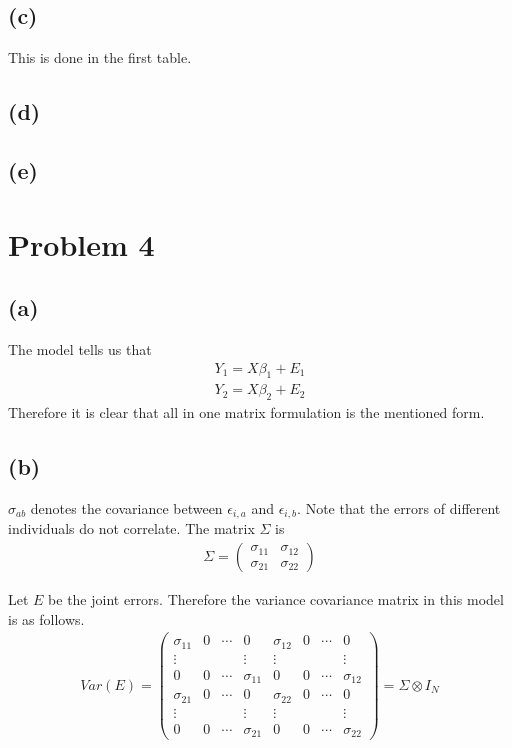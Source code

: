 \documentclass{article}
\begin{document}
\subsection{(c)}
This is done in the first table.

\subsection{(d)}
\subsection{(e)}

\section{Problem 4}
\subsection{(a)}
The model tells us that
\begin{align*}
	Y_1 = X\beta_1 + E_1\\
	Y_2 = X\beta_2 + E_2
\end{align*}
Therefore it is clear that all in one matrix formulation is the mentioned form.

\subsection{(b)}
$\sigma_{ab}$ denotes the covariance between $\epsilon_{i,a}$ and $\epsilon_{i, b}$. Note that the errors of different individuals do not correlate. The matrix $\Sigma$ is
\begin{align*}
\Sigma = \begin{pmatrix}
\sigma_{11} & \sigma_{12}\\
\sigma_{21} & \sigma_{22}
\end{pmatrix}
\end{align*}

 Let $E$ be the joint errors. Therefore the variance covariance matrix in this model is as follows.
\begin{align*}
	Var\left(E \right) = \begin{pmatrix}\sigma_{11}& 0& \cdots& 0&\sigma_{12}&0 &\cdots & 0\\
	\vdots&&&\vdots&\vdots&&&\vdots\\
	0&0&\cdots&\sigma_{11}&0&0&\cdots&\sigma_{12}\\
	\sigma_{21}& 0& \cdots& 0&\sigma_{22}&0 &\cdots & 0\\
	\vdots&&&\vdots&\vdots&&&\vdots\\
	0&0&\cdots&\sigma_{21}&0&0&\cdots&\sigma_{22}
	\end{pmatrix}
	=\Sigma \otimes I_N
\end{align*}
\end{document}
